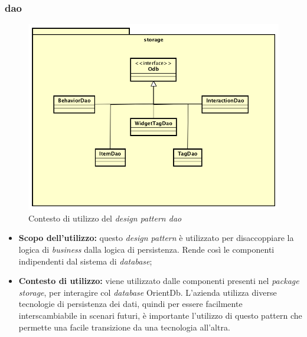 \subsubsection{\gls{dao}}
\begin{figure}[h]
\centering
\includegraphics[scale=0.20]{immagini/storage}
\caption{Contesto di utilizzo del \emph{design pattern \gls{dao}}}
\label{fig:pattern-dao}
\end{figure}
\begin{itemize}
\item\textbf{Scopo dell'utilizzo:} questo \emph{design pattern} è utilizzato per disaccoppiare la logica di \emph{business} dalla logica di persistenza. Rende così le componenti indipendenti dal sistema di \emph{database};
\item \textbf{Contesto di utilizzo:} viene utilizzato dalle componenti presenti nel \emph{package storage}, per interagire col \emph{database} OrientDb. L'azienda utilizza diverse tecnologie di persistenza dei dati, quindi per essere facilmente interscambiabile in scenari futuri, è importante l'utilizzo di questo pattern che permette una facile transizione da una tecnologia all'altra.
\end{itemize}
